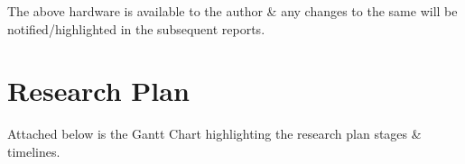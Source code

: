 \documentclass[11pt]{article}
\begin{document}
The above hardware is available to the author \& any changes to the same will be notified/highlighted in the subsequent reports.
\section{Research Plan}\label{plan}

Attached below is the Gantt Chart highlighting the research plan stages \& timelines.


\end{document}

